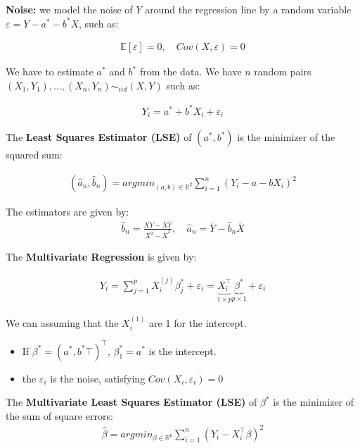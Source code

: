 \textbf{Noise:} we model the noise of $Y$ around the regression line by a random variable $\varepsilon = Y - a^{*} - b^{*} X$, such as:

\begin{align*}
\mathbb{E}[\varepsilon] = 0, \quad Cov(X, \varepsilon) = 0
\end{align*}

We have to estimate $a^{*}$ and $b^{*}$ from the data. We have $n$ random pairs $(X_1, Y_1), \ldots, (X_n, Y_n) \sim_{iid} (X, Y)$ such as:

\begin{align*}
Y_i = a^{*} + b^{*} X_i + \varepsilon_i
\end{align*}

The \textbf{Least Squares Estimator (LSE)} of $(a^{*}, b^{*})$ is the minimizer of the squared sum:

\begin{align*}
(\hat{a}_n, \hat{b}_n) = argmin_{(a, b) \in \mathbb{R}^2}\sum_{i=1}^n(Y_i - a - bX_i)^2
\end{align*}

The estimators are given by:
\begin{align*}
\hat{b}_n = \frac{\overline{XY} - \bar{X}\bar{Y}}{\overline{X^2} - \bar{X}^2}, \quad \hat{a}_n = \bar{Y} - \hat{b}_n \bar{X}
\end{align*}

The \textbf{Multivariate Regression} is given by:

\begin{align*}
Y_i = \sum_{j=1}^pX_i^{(j)}\beta_j^{*} + \varepsilon_i= \underbrace{X_i^\top}_{1 \times p}\underbrace{\beta^{*}}_{p \times 1} + \varepsilon_i
\end{align*}

We can assuming that the $X_i^{(1)}$ are 1 for the intercept.

\begin{itemize}
\item If $\beta^{*} = (a^{*}, b^{*}\top)^\top$, $\beta_1^{*} = a^{*}$ is the intercept.
\item the $\varepsilon_i$ is the noise, satisfying $Cov(X_i, \varepsilon_i) = 0$
\end{itemize}

The \textbf{Multivariate Least Squares Estimator (LSE)} of $\beta^{*}$ is the minimizer of the sum of square errors:
\begin{align*}
\hat{\beta} = argmin_{\beta \in \mathbb{R}^p}\sum_{i=1}^n(Y_i - X_i^\top\beta)^2
\end{align*}

